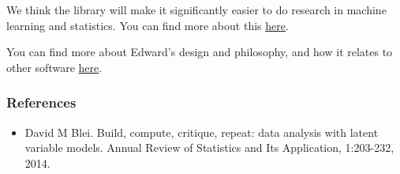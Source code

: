 We think the library will make it significantly easier to do research in
machine learning and statistics. You can find more about this
\href{guide-research.md}{here}.

You can find more about Edward's design and philosophy, and how it
relates to other software \href{design.md}{here}.

\subsubsection{References}\label{references}

\begin{itemize}
\tightlist
\item
  David M Blei. Build, compute, critique, repeat: data analysis with
  latent variable models. Annual Review of Statistics and Its
  Application, 1:203-232, 2014.
\end{itemize}
